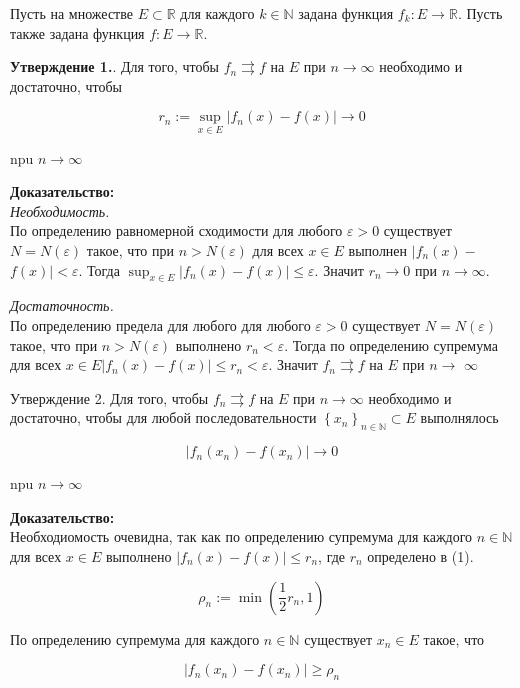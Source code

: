 \documentclass[a4paper,12pt]{article} %
\begin{document}
	Пусть на множестве $E \subset \mathbb{R}$ для каждого $k \in \mathbb{N}$ задана функция $f_{k}: E \rightarrow \mathbb{R}$. Пусть также задана функция $f: E \rightarrow \mathbb{R}$.
	
	\textbf{Утверждение 1.}. Для того, чтобы $f_{n} \rightrightarrows f$ на $E$ при $n \rightarrow \infty$ необходимо и достаточно, чтобы
	
	$$
	r_{n}:=\sup _{x \in E}\left|f_{n}(x)-f(x)\right| \rightarrow 0
	$$
	
	npu $n \rightarrow \infty$
	
	\textbf{Доказательство:\\}
	\textit{Необходимость.}\\ По определению равномерной сходимости для любого $\varepsilon>0$ существует $N=N(\varepsilon)$ такое, что при $n>N(\varepsilon)$ для всех $x \in E$ выполнен $\mid f_{n}(x)-$ $f(x) \mid<\varepsilon$. Тогда $\sup _{x \in E}\left|f_{n}(x)-f(x)\right| \leq \varepsilon$. Значит $r_{n} \rightarrow 0$ при $n \rightarrow \infty$.
	
	\textit{Достаточность.}\\ По определению предела для любого для любого $\varepsilon>0$ существует $N=N(\varepsilon)$ такое, что при $n>N(\varepsilon)$ выполнено $r_{n}<\varepsilon$. Тогда по определению супремума для всех $x \in E\left|f_{n}(x)-f(x)\right| \leq r_{n}<\varepsilon$. Значит $f_{n} \rightrightarrows f$ на $E$ при $n \rightarrow$ $\infty$
	
	Утверждение 2. Для того, чтобы $f_{n} \rightrightarrows f$ на $E$ при $n \rightarrow \infty$ необходимо и достаточно, чтобы для любой последовательности $\left\{x_{n}\right\}_{n \in \mathbb{N}} \subset E$ выполнялось
	
	$$
	\left|f_{n}\left(x_{n}\right)-f\left(x_{n}\right)\right| \rightarrow 0
	$$
	
	npu $n \rightarrow \infty$
	
	\textbf{Доказательство:\\}
	Необходиомость очевидна, так как по определению супремума для каждого $n \in \mathbb{N}$ для всех $x \in E$ выполнено $\left|f_{n}(x)-f(x)\right| \leq r_{n}$, где $r_{n}$ определено в (1).
	
	$$
	\rho_{n}:=\min \left(\frac{1}{2} r_{n}, 1\right)
	$$
	
	По определению супремума для каждого $n \in \mathbb{N}$ существует $x_{n} \in E$ такое, что
	
	$$
	\left|f_{n}\left(x_{n}\right)-f\left(x_{n}\right)\right| \geq \rho_{n}
	$$
	
\end{document}
